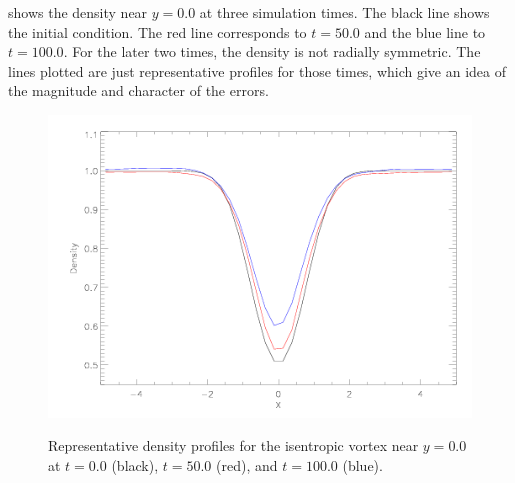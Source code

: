  shows the density near $y=0.0$ at three simulation
times. The black line shows the initial condition. The red line
corresponds to $t=50.0$ and the blue line to $t=100.0$. For the
later two times, the density is not radially symmetric. The lines
plotted are just representative profiles for those times, which give
an idea of the magnitude and character of the errors.
\begin{figure}
\begin{center}
{\leavevmode\includegraphics[width=5in]{IsentropicVortex4}}
\end{center}
\caption{\label{Fig:iv4} Representative density profiles for the isentropic
vortex near $y=0.0$ at $t=0.0$ (black), $t=50.0$ (red), and $t=100.0$ (blue).}
\end{figure}

%

